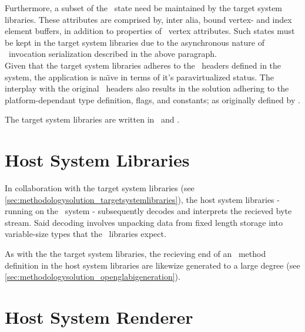 Furthermore, a subset of the \dvttermopengl\ state need be maintained by the target system libraries.
These attributes are comprised by, inter alia, bound vertex- and index element buffers, in addition to properties of \dvttermopengl\ vertex attributes.
Such states must be kept in the target system libraries due to the asynchronous nature of \dvttermopengl\ invocation serialization described in the above paragraph.\\

\noindent
Given that the target system libraries adheres to the \dvttermopengl\ headers defined in the system, the application is na\"{\i}ve in terms of it's paravirtualized status.
The interplay with the original \dvttermopengles\ headers also results in the solution adhering to the platform-dependant type definition, flags, and constants; as originally defined by \dvttermkhronos .

The target system libraries are written in \dvttermc\ and \dvttermcplusplus .\\

\section{Host System Libraries}
\label{sec:methodologysolution_hostsystemlibraries}
In collaboration with the target system libraries (see \ref{sec:methodologysolution_targetsystemlibraries}), the host system libraries - running on the \dvttermhost\ system - subsequently decodes and interprets the recieved byte stream.
Said decoding involves unpacking data from fixed length storage into variable-size types that the \dvttermopengl\ libraries expect.


As with the the target system libraries, the recieving end of an \dvttermopengl\ method definition in the host system libraries are likewize generated to a large degree (see \ref{sec:methodologysolution_openglabigeneration}).



\section{Host System Renderer}
\label{sec:methodologysolution_hostsystemrenderer}



